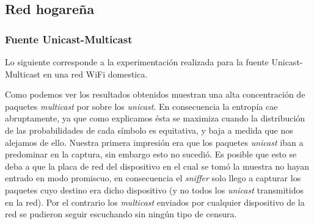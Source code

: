 \subsection{Red hogareña}

\subsubsection{Fuente Unicast-Multicast}

 Lo siguiente corresponde a la experimentación realizada para la fuente Unicast-Multicast en una red WiFi domestica.
 
\begin{figure}
	\begin{minipage}[b]{0.9\linewidth}
	\end{minipage}
\end{figure}

Como podemos ver los resultados obtenidos muestran una alta concentración de
paquetes \textit{multicast} por sobre los \textit{unicast}. En consecuencia la
entropía cae abruptamente, ya que como explicamos ésta se maximiza cuando la
distribución de las probabilidades de cada símbolo es equitativa, y baja a
medida que nos alejamos de ello. Nuestra primera impresión era que los
paquetes \textit{unicast} iban a predominar en la captura, sin embargo esto no
sucedió. Es posible que esto se deba a que la placa de red del dispositivo en
el cual se tomó la muestra no hayan entrado en modo promiscuo, en consecuencia
el \textit{sniffer} solo llego a capturar los paquetes cuyo destino era dicho
dispositivo (y no todos los \textit{unicast} transmitidos en la red). Por el
contrario los \textit{multicast} enviados por cualquier dispositivo de la red
se pudieron seguir escuchando sin ningún tipo de censura.
 

